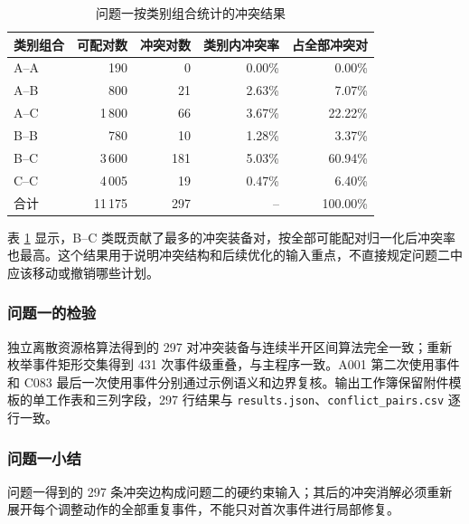 \begin{table}[H]
\centering
\caption{问题一按类别组合统计的冲突结果}
\label{tab:q1-category}
\begin{tabular}{lrrrr}
\toprule
类别组合 & 可配对数 & 冲突对数 & 类别内冲突率 & 占全部冲突对 \\
\midrule
A--A & 190 & 0 & 0.00\% & 0.00\% \\
A--B & 800 & 21 & 2.63\% & 7.07\% \\
A--C & 1\,800 & 66 & 3.67\% & 22.22\% \\
B--B & 780 & 10 & 1.28\% & 3.37\% \\
B--C & 3\,600 & 181 & 5.03\% & 60.94\% \\
C--C & 4\,005 & 19 & 0.47\% & 6.40\% \\
\midrule
合计 & 11\,175 & 297 & -- & 100.00\% \\
\bottomrule
\end{tabular}
\end{table}

表 \ref{tab:q1-category} 显示，B--C 类既贡献了最多的冲突装备对，按全部可能配对归一化后冲突率也最高。这个结果用于说明冲突结构和后续优化的输入重点，不直接规定问题二中应该移动或撤销哪些计划。

\subsubsection{问题一的检验}
独立离散资源格算法得到的 297 对冲突装备与连续半开区间算法完全一致；重新枚举事件矩形交集得到 431 次事件级重叠，与主程序一致。A001 第二次使用事件和 C083 最后一次使用事件分别通过示例语义和边界复核。输出工作簿保留附件模板的单工作表和三列字段，297 行结果与 \texttt{results.json}、\texttt{conflict\_pairs.csv} 逐行一致。

\subsubsection{问题一小结}
问题一得到的 297 条冲突边构成问题二的硬约束输入；其后的冲突消解必须重新展开每个调整动作的全部重复事件，不能只对首次事件进行局部修复。
